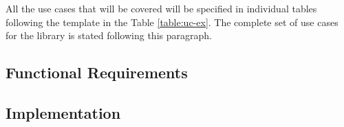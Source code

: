 All the use cases that will be covered will be specified in individual tables
following the template in the Table \ref{table:uc-ex}. The complete set of use
cases for the library is stated following this paragraph.

\subsection{Functional Requirements}
\subsection{Implementation}

\newpage